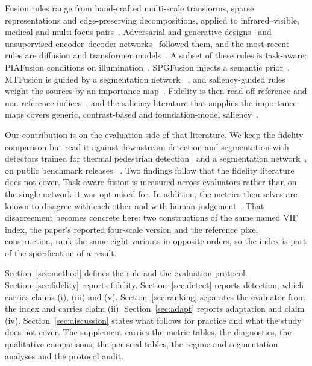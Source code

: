 \documentclass[preprint,10pt]{elsarticle}
\begin{document}
Fusion rules range from hand-crafted multi-scale transforms, sparse representations and
edge-preserving decompositions, applied to infrared--visible, medical and multi-focus
pairs~\cite{zhu2017,zhang2021,yin2013,nejati2015,yin2015,wang2014,zhang2016,wei2017,fu2009,ma2021,chen2007,piella}.
Adversarial and generative designs~\cite{ma20191,hou2021,yi2021,song2022} and
unsupervised encoder--decoder networks~\cite{xu2022,li2021,li2019,zhang2020,wang2024,liu2023,hao2022,yang2023,an2024}
followed them, and the most recent rules are diffusion and transformer
models~\cite{yi2024,yang2025}. A subset of these
rules is task-aware: PIAFusion conditions on illumination~\cite{tang2022}, SPGFusion
injects a semantic prior~\cite{zhang2026}, MTFusion is guided by a segmentation network
~\cite{zhou2026}, and saliency-guided rules weight the sources by an importance
map~\cite{bianco2020,khan2025,wang2025,xu2021}. Fidelity is then read off reference and
non-reference indices~\cite{sheikh2006,ma2019}, and the saliency literature that
supplies the importance maps covers generic, contrast-based and foundation-model
saliency~\cite{qin2020,zhu2025,kirillov2023sam,bianco2020,guo2024,petilli2022,li2010}.

Our contribution is on the evaluation side of that literature. We keep the fidelity
comparison but read it against downstream detection and segmentation with detectors
trained for thermal pedestrian detection~\cite{redmon2016yolo,jocher2024yolo,lv2024rtdetr}
and a segmentation network~\cite{ronneberger2015}, on public benchmark releases
~\cite{flir_adas}. Two findings follow that the fidelity literature does not cover.
Task-aware fusion is measured across evaluators rather than on the single network it
was optimised for. In addition, the metrics themselves are known to disagree with each
other and with human judgement~\cite{ma2019}. That disagreement becomes concrete here:
two constructions of the same named VIF index, the paper's reported four-scale version
and the reference pixel construction, rank the same eight variants in opposite orders,
so the index is part of the specification of a result.

Section~\ref{sec:method} defines the rule and the evaluation protocol.
Section~\ref{sec:fidelity} reports fidelity. Section~\ref{sec:detect} reports
detection, which carries claims (i), (iii) and (v). Section~\ref{sec:ranking}
separates the evaluator from the index and carries claim (ii).
Section~\ref{sec:adapt} reports adaptation and claim (iv).
Section~\ref{sec:discussion} states what follows for practice and what the study does
not cover. The supplement carries the metric tables, the diagnostics, the qualitative
comparisons, the per-seed tables, the regime and segmentation analyses and the
protocol audit.
\end{document}
